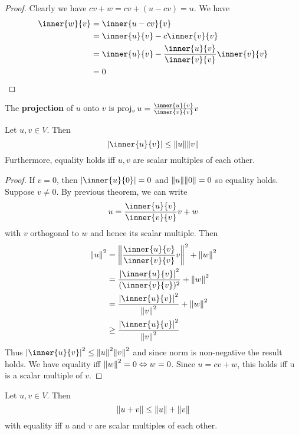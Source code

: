 \documentclass{article}
\DeclareMathOperator{\proj}{proj}
\begin{document}
    \begin{proof}
      Clearly we have $cv + w = cv + (u-cv) = u$. We have
      \begin{align*}
        \inner{w}{v} &= \inner{u-cv}{v}\\
        &= \inner{u}{v} - c\inner{v}{v}\\
        &= \inner{u}{v} - \frac{\inner{u}{v}}{\inner{v}{v}} \inner{v}{v}\\
        &= 0\\
      \end{align*}
    \end{proof}
    \begin{definition}
      The \textbf{projection} of $u$ onto $v$ is $\proj_vu = \frac{\inner{u}{v}}{\inner{v}{v}}v$
    \end{definition}
    \begin{cthm}
      Let $u, v \in V$. Then \[
        \abs{\inner{u}{v}} \leq \norm{u}\norm{v}
      \]
      Furthermore, equality holds iff $u, v$ are scalar multiples of each other.
    \end{cthm}
    \begin{proof}
      If $v = 0$, then $\abs{\inner{u}{0}} = 0$ and $\norm{u}\norm{0} = 0$ so equality holds. Suppose $v \neq 0$. By previous theorem, we can write \[
        u = \frac{\inner{u}{v}}{\inner{v}{v}}v + w
      \] with $v$ orthogonal to $w$ and hence its scalar multiple. Then
      \begin{align*}
        \norm{u}^2 &= \norm{\frac{\inner{u}{v}}{\inner{v}{v}}v}^2 + \norm{w}^2\\
        &= \frac{\abs{\inner{u}{v}}^2}{(\inner{v}{v})^2} + \norm{w}^2\\
        &= \frac{\abs{\inner{u}{v}}^2}{\norm{v}^2} + \norm{w}^2\\
        &\geq \frac{\abs{\inner{u}{v}}^2}{\norm{v}^2}
      \end{align*}
      Thus $\abs{\inner{u}{v}}^2 \leq \norm{u}^2 \norm{v}^2$ and since norm is non-negative the result holds. We have equality iff $\norm{w}^2 = 0 \Leftrightarrow w = 0$. Since $u = cv + w$, this holds iff u is a scalar multiple of $v$.
    \end{proof}
    \begin{cthm}
      Let $u, v \in V$. Then \[
        \norm{u+v} \leq \norm{u} + \norm{v}
      \] with equality iff $u$ and $v$ are scalar multiples of each other.
    \end{cthm}
\end{document}
